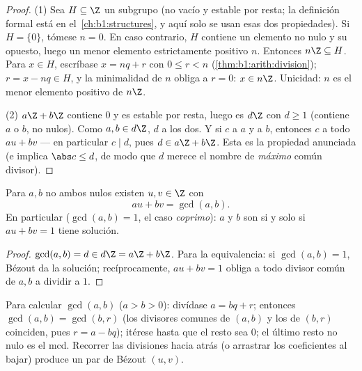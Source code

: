 \begin{proof}
(1) Sea $H \subseteq \Z$ un subgrupo (no vacío y estable por resta; la
definición formal está en el~\cref{ch:b1:structures}, y aquí solo se
usan esas dos propiedades). Si $H = \{0\}$, tómese $n = 0$. En caso
contrario, $H$ contiene un elemento no nulo y su opuesto, luego un
menor elemento estrictamente positivo $n$. Entonces $n\Z \subseteq H$.
Para $x \in H$, escríbase $x = nq + r$ con $0 \leq r < n$
(\cref{thm:b1:arith:division}); $r = x - nq \in H$, y la minimalidad de
$n$ obliga a $r = 0$: $x \in n\Z$. Unicidad: $n$ es el menor elemento
positivo de $n\Z$.

(2) $a\Z + b\Z$ contiene $0$ y es estable por resta, luego es $d\Z$ con
$d \geq 1$ (contiene $a$ o $b$, no nulos). Como $a, b \in d\Z$, $d$
 a los dos. Y si $c$  a $a$ y a $b$, entonces $c$
 a todo $au + bv$ --- en particular $c \mid d$, pues $d \in a\Z
+ b\Z$. Esta es la propiedad anunciada (e implica $\abs c \leq d$, de
modo que $d$ merece el nombre de \emph{máximo} común divisor).
\end{proof}

\begin{corollary}\label{cor:b1:arith:bezout}
Para $a, b$ no ambos nulos existen $u, v \in \Z$ con
\[
au + bv = \gcd(a, b) .
\]
En particular ($\gcd(a,b) = 1$, el caso
\emph{coprimo}): $a$ y $b$ son  si y solo si
$au + bv = 1$ tiene solución.
\end{corollary}

\begin{proof}
$\gcd(a,b) = d \in d\Z = a\Z + b\Z$. Para la equivalencia: si
$\gcd(a,b) = 1$, Bézout da la solución; recíprocamente, $au + bv = 1$
obliga a todo divisor común de $a, b$ a dividir a $1$.
\end{proof}

\begin{method}\label{met:b1:arith:euclid}
Para calcular $\gcd(a, b)$ ($a > b > 0$): divídase $a = bq + r$;
entonces $\gcd(a, b) = \gcd(b, r)$ (los divisores comunes de $(a,b)$ y
los de $(b,r)$ coinciden, pues $r = a - bq$); itérese hasta que el
resto sea $0$; el último resto no nulo es el
mcd. Recorrer las divisiones hacia atrás
(o arrastrar los coeficientes al bajar) produce un par de Bézout
$(u, v)$.
\end{method}

